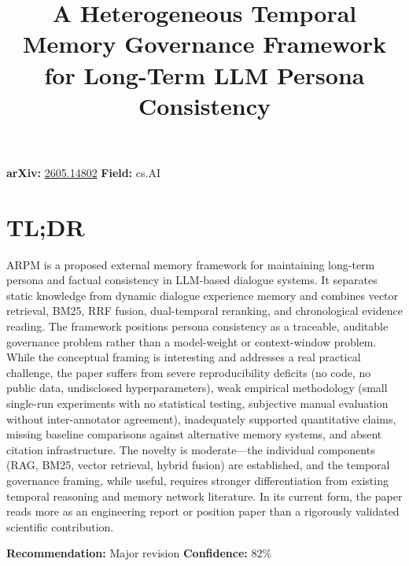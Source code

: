 \documentclass[11pt]{article}
\title{A Heterogeneous Temporal Memory Governance Framework for Long-Term LLM Persona Consistency}
\date{}
\begin{document}
\maketitle

\noindent\textbf{arXiv:} \href{https://arxiv.org/abs/2605.14802}{2605.14802} \quad \textbf{Field:} cs.AI\\

\section*{TL;DR}
ARPM is a proposed external memory framework for maintaining long-term persona and factual consistency in LLM-based dialogue systems. It separates static knowledge from dynamic dialogue experience memory and combines vector retrieval, BM25, RRF fusion, dual-temporal reranking, and chronological evidence reading. The framework positions persona consistency as a traceable, auditable governance problem rather than a model-weight or context-window problem. While the conceptual framing is interesting and addresses a real practical challenge, the paper suffers from severe reproducibility deficits (no code, no public data, undisclosed hyperparameters), weak empirical methodology (small single-run experiments with no statistical testing, subjective manual evaluation without inter-annotator agreement), inadequately supported quantitative claims, missing baseline comparisons against alternative memory systems, and absent citation infrastructure. The novelty is moderate—the individual components (RAG, BM25, vector retrieval, hybrid fusion) are established, and the temporal governance framing, while useful, requires stronger differentiation from existing temporal reasoning and memory network literature. In its current form, the paper reads more as an engineering report or position paper than a rigorously validated scientific contribution.

\textbf{Recommendation:} Major revision \quad \textbf{Confidence:} 82\%\\
\end{document}
